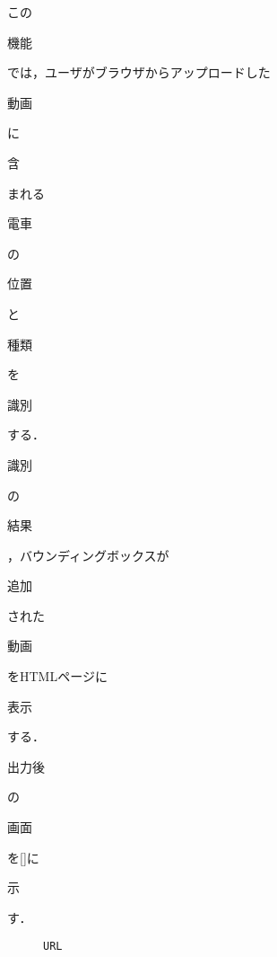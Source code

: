 \documentclass[10pt]{article}
\begin{document}
 この\begin{CJK}{UTF8}{mj}機能\end{CJK}では，ユーザがブラウザからアップロードした\begin{CJK}{UTF8}{mj}動画\end{CJK}に\begin{CJK}{UTF8}{mj}含\end{CJK}まれる\begin{CJK}{UTF8}{mj}電車\end{CJK}の\begin{CJK}{UTF8}{mj}位置\end{CJK}と\begin{CJK}{UTF8}{mj}種類\end{CJK}を\begin{CJK}{UTF8}{mj}識別\end{CJK}する． \begin{CJK}{UTF8}{mj}識別\end{CJK}の\begin{CJK}{UTF8}{mj}結果\end{CJK}，バウンディングボックスが\begin{CJK}{UTF8}{mj}追加\end{CJK}された\begin{CJK}{UTF8}{mj}動画\end{CJK}をHTMLページに\begin{CJK}{UTF8}{mj}表示\end{CJK}する．\begin{CJK}{UTF8}{mj}出力後\end{CJK}の\begin{CJK}{UTF8}{mj}画面\end{CJK}を\ref{}に\begin{CJK}{UTF8}{mj}示\end{CJK}す．\begin{figure}[h]
\texttt{URL}
\end{figure}
\end{document}

